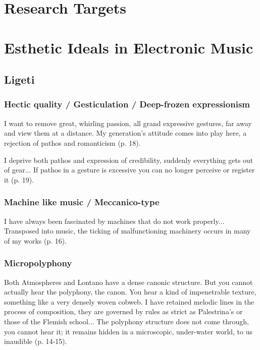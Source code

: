 \documentclass[a4paper,11pt]{article}
\begin{document}
\section{Research Targets}  %
\label{sec:research_targets}

\section{Esthetic Ideals in Electronic Music}
\label{sec:esthetic_ideals_in_Electronic_music}

\subsection{Ligeti}
\label{sub:eshtetic_ligeti}

\subsubsection{Hectic quality / Gesticulation / Deep-frozen expressionism}
\label{subs:ligeti:hectic}

I want to remove great, whirling passion, all grand expressive gestures, far away and view them at a distance.
My generation's attitude comes into play here, a rejection of pathos and romanticism (p. 18).

I deprive both pathos and expression of credibility, suddenly everything gets out of gear...
If pathos in a gesture is excessive you can no longer perceive or register it (p. 19).

\subsubsection{Machine like music / Meccanico-type}
\label{subs:ligeti:machine}

I have always been fascinated by machines that do not work properly...
Transposed into music, the ticking of malfunctioning machinery occurs in many of my works (p. 16).

\subsubsection{Micropolyphony}
\label{subs:ligeti:micropolyphony}

Both Atmospheres and Lontano have a dense canonic structure.
But you cannot actually hear the polyphony, the canon.
You hear a kind of impenetrable texture, something like a very densely woven cobweb.
I have retained melodic lines in the process of composition, they are governed by rules as strict as Palestrina’s or those of the Flemish school...
The polyphony structure does not come through, you cannot hear it; it remains hidden in a microscopic, under-water world, to us inaudible (p. 14-15).
\end{document}
